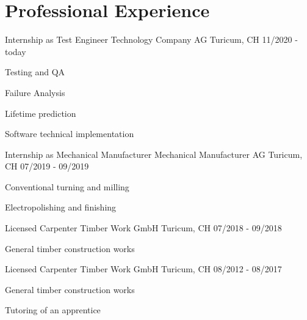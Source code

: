 \section{Professional Experience}
\cventry
{Internship as Test Engineer} %
{Technology Company AG} %
{Turicum, CH} %
{11/2020 - today} %
\begin{cvitems}
\item {Testing and QA}
\item {Failure Analysis}
\item {Lifetime prediction}
\item {Software technical implementation}
\end{cvitems}

\cventry
{Internship as Mechanical Manufacturer} %
{Mechanical Manufacturer AG} %
{Turicum, CH} %
{07/2019 - 09/2019} %
\begin{cvitems}
\item {Conventional turning and milling}
\item {Electropolishing and finishing}
\end{cvitems}

\cventry
{Licensed Carpenter} %
{Timber Work GmbH} %
{Turicum, CH} %
{07/2018 - 09/2018} %
\begin{cvitems}
\item {General timber construction works}
\end{cvitems}

\cventry
{Licensed Carpenter} %
{Timber Work GmbH} %
{Turicum, CH} %
{08/2012 - 08/2017} %
\begin{cvitems}
\item {General timber construction works}
\item {Tutoring of an apprentice}
\end{cvitems}